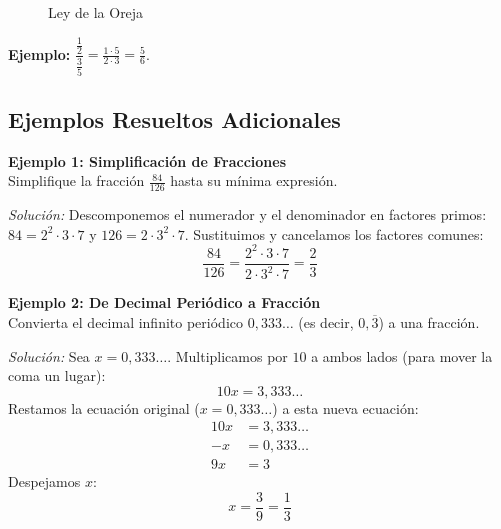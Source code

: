 \begin{enumerate}
\begin{figure}[ht]
    \caption{Ley de la Oreja}\label{fig:leyoreja}
    \end{figure}


    \textbf{Ejemplo:} $\dfrac{\frac{1}{2}}{\frac{3}{5}} = \frac{1 \cdot 5}{2 \cdot 3} = \frac{5}{6}$.
    
\end{enumerate}

\subsection*{Ejemplos Resueltos Adicionales}

\textbf{Ejemplo 1: Simplificación de Fracciones} \\
Simplifique la fracción $\frac{84}{126}$ hasta su mínima expresión.

\textit{Solución:}
Descomponemos el numerador y el denominador en factores primos:
$84 = 2^2 \cdot 3 \cdot 7$ y $126 = 2 \cdot 3^2 \cdot 7$.
Sustituimos y cancelamos los factores comunes:
\[ \frac{84}{126} = \frac{2^2 \cdot 3 \cdot 7}{2 \cdot 3^2 \cdot 7} = \frac{2}{3} \]

\vspace{0.3cm}

\textbf{Ejemplo 2: De Decimal Periódico a Fracción} \\
Convierta el decimal infinito periódico $0,333\dots$ (es decir, $0,\overline{3}$) a una fracción.

\textit{Solución:}
Sea $x = 0,333\dots$.
Multiplicamos por $10$ a ambos lados (para mover la coma un lugar):
\[ 10x = 3,333\dots \]
Restamos la ecuación original ($x = 0,333\dots$) a esta nueva ecuación:
\begin{align*}
    10x &= 3,333\dots \\
    - x &= 0,333\dots \\
    \hline
    9x &= 3
\end{align*}
Despejamos $x$:
\[ x = \frac{3}{9} = \frac{1}{3} \]

